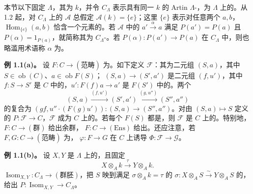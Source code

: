 本节以下固定  $\Lambda$，其为 $k$，并令 $C_\Lambda$ 表示具有同一 $k$ 的 Artin  $\Lambda$-，为 $\Lambda$ 上的。从 1.2 起，对 $C_\Lambda$ 上的 $\mathcal A$ 总假定 $\mathcal A(k)=\{e\}$；这里 $\{e\}$ 表示对任意两个 $a,b$，$\operatorname{Hom}_{\{e\}}(a,b)$ 恰含一个元素的。若 $\mathcal A$ 中的 $a'\xrightarrow\alpha a$ 满足 $P(a')=P(a)$ 且 $P(\alpha)=1_{P(a)}$，就简称其为 $C_\Lambda$-。若 $P(\alpha):P(a')\to P(a)$ 在 $C_\Lambda$ 中，则也略滥用术语称 $\alpha$ 为。

\textbf{例 1.1(a)。} 设 $F:C\to(\text{范畴})$ 为。如下定义 $\mathcal F$：其为二元组 $(S,a)$，其中 $S\in\operatorname{ob}(C)$、$a\in\operatorname{ob}F(S)$； $(S,a)\to(S',a')$ 是二元组 $(f,u')$，其中 $f:S\to S'$ 是 $C$ 中的，$u':F(f)a\to a'$ 是 $F(S')$ 中的。两个
\[(S,a)\xrightarrow{(f,u')}(S',a')\xrightarrow{(g,u'')}(S'',a'')\]
的复合为 $(gf,u''\cdot(F(g)u')):(S,a)\to(S'',a'')$。对由 $(S,a)\mapsto S$ 定义的 $P:\mathcal F\to C$，$\mathcal F$ 成为 $C$ 上的。若每个 $F(S)$ 都是，则 $\mathcal F$ 是 $C$ 上的。特别地， $F:C\to(\text{群})$ 给出余群， $F:C\to(\mathrm{Ens})$ 给出。还应注意，若 $F,G:C\to(\text{范畴})$ 为， $\varphi:F\to G$ 在 $C$ 上诱导 $\Phi:\mathcal F\to\mathcal G$。

\textbf{例 1.1(b)。} 设 $X,Y$ 是 $\Lambda$ 上的，且固定
\[X\otimes_Ak\xrightarrow\tau Y\otimes_Ak.\]
 $\operatorname{Isom}_{X,Y}:C_\Lambda\to(\text{群胚})$，把 $S$ 映到满足 $\sigma\otimes_Ak=\tau$ 的 $\sigma:X\otimes_AS\xrightarrow\sim Y\otimes_AS$ 的，给出 $P:\operatorname{Isom}_{X,Y}\to C_\Lambda$。

